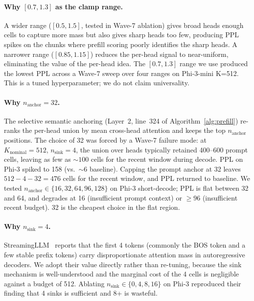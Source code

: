 \documentclass[sigconf, anonymous=false, screen=true]{acmart}
\begin{document}
\paragraph{Why $[0.7, 1.3]$ as the clamp range.}
A wider range ($[0.5, 1.5]$, tested in Wave-7 ablation) gives broad heads enough cells to capture more mass but also gives sharp heads too few, producing PPL spikes on the chunks where prefill scoring poorly identifies the sharp heads. A narrower range ($[0.85, 1.15]$) reduces the per-head signal to near-uniform, eliminating the value of the per-head idea. The $[0.7, 1.3]$ range we use produced the lowest PPL across a Wave-7 sweep over four ranges on Phi-3-mini K=512. This is a tuned hyperparameter; we do not claim universality.

\paragraph{Why $n_{\text{anchor}} = 32$.}
The selective semantic anchoring (Layer~2, line~324 of Algorithm~\ref{alg:prefill}) re-ranks the per-head union by mean cross-head attention and keeps the top $n_{\text{anchor}}$ positions. The choice of 32 was forced by a Wave-7 failure mode: at $K_{\text{nominal}}=512$, $n_{\text{sink}}=4$, the union over heads typically retained 400--600 prompt cells, leaving as few as $\sim 100$ cells for the recent window during decode. PPL on Phi-3 spiked to 158 (vs.\ $\sim 6$ baseline). Capping the prompt anchor at 32 leaves $512 - 4 - 32 = 476$ cells for the recent window, and PPL returned to baseline. We tested $n_{\text{anchor}} \in \{16, 32, 64, 96, 128\}$ on Phi-3 short-decode; PPL is flat between 32 and 64, and degrades at 16 (insufficient prompt context) or $\ge 96$ (insufficient recent budget). 32 is the cheapest choice in the flat region.

\paragraph{Why $n_{\text{sink}} = 4$.}
StreamingLLM~\cite{xiao2024streamingllm} reports that the first 4 tokens (commonly the BOS token and a few stable prefix tokens) carry disproportionate attention mass in autoregressive decoders. We adopt their value directly rather than re-tuning, because the sink mechanism is well-understood and the marginal cost of the 4 cells is negligible against a budget of 512. Ablating $n_{\text{sink}} \in \{0, 4, 8, 16\}$ on Phi-3 reproduced their finding that 4 sinks is sufficient and 8+ is wasteful.
\end{document}
